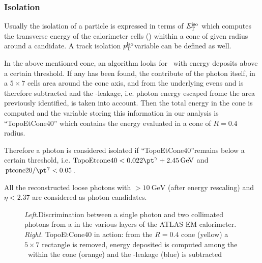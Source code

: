 \subsubsection{Isolation}
Usually the isolation of a particle is expressed in terms of $E_\textup{T}^{\textup{iso}}$ which computes the transverse energy of the calorimeter cells (\topo) whithin a cone of given radius around a candidate. A track isolation $p_\textup{T}^{\textup{iso}}$variable can be defined as well.

In the above mentioned cone, an algorithm looks for \topo~with energy deposits above a certain threshold. If any has been found, the contribute of the photon itself, in a $5\times7$ cells area around the cone axis, and from the underlying evens and \pileup is therefore subtracted and the \pt-leakage, i.e. photon energy escaped frome the area previously identified, is taken into account. Then the total energy in the cone is computed and the variable storing this information in our analysis is ``TopoEtCone40'' which contains the energy evaluated in a cone of $R=0.4$ radius. 

Therefore a photon is considered isolated if ``TopoEtCone40''remains below a certain threshold, i.e. $\text{TopoEtcone40} < 0.022\pt^\gamma + \SI{2.45}{\GeV}$ and $\text{ptcone20}/\pt^\gamma<0.05$.

All the reconstructed loose photons with \ET $> \SI{10}{\GeV}$ (after energy rescaling) and $\eta<2.37$ are considered as photon candidates.

\begin{figure}[tp]
\centering
{} \quad
{} 
\caption{\emph{Left}.Discrimination between a single photon and two collimated photons from a \pizero in the various layers of the ATLAS EM calorimeter.\\ \emph{Right}. TopoEtCone40 in action: from the $R=0.4$ cone (yellow) a $5\times7$ rectangle is removed, energy deposited is computed among the \topo~within the cone (orange) and the \pt-leakage (blue) is subtracted}

\end{figure}

